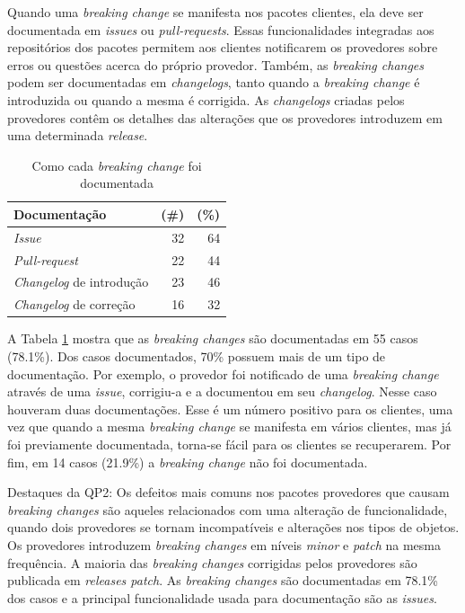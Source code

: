 Quando uma \textit{breaking change} se manifesta nos pacotes clientes, ela deve ser documentada em \textit{issues} ou \textit{pull-requests}. Essas funcionalidades integradas aos repositórios dos pacotes permitem aos clientes notificarem os provedores sobre erros ou questões acerca do próprio provedor. Também, as \textit{breaking changes} podem ser documentadas em \textit{changelogs}, tanto quando a \textit{breaking change} é introduzida ou quando a mesma é corrigida. As \textit{changelogs} criadas pelos provedores contêm os detalhes das alterações que os provedores introduzem em uma determinada \textit{release}.

\begin{table}
	\centering
	\caption{Como cada \textit{breaking change} foi documentada}
	\begin{tabular}{lrr}
		\toprule
		\textbf{Documentação} & \textbf{(\#)} & \textbf{(\%)}   \\ \hline
		\textit{Issue}        & 32            & 64              \\
		\textit{Pull-request} & 22            & 44              \\
		\textit{Changelog} de introdução & 23 & 46              \\
		\textit{Changelog} de correção   & 16 & 32              \\ %
		\bottomrule
	\end{tabular}
	\label{tab:bc_documentation}
\end{table}

A Tabela \ref{tab:bc_documentation} mostra que as \textit{breaking changes} são documentadas em 55 casos (78.1\%). Dos casos documentados, 70\% possuem mais de um tipo de documentação. Por exemplo, o provedor foi notificado de uma \textit{breaking change} através de uma \textit{issue}, corrigiu-a e a documentou em seu \textit{changelog}. Nesse caso houveram duas documentações. Esse é um número positivo para os clientes, uma vez que quando a mesma \textit{breaking change} se manifesta em vários clientes, mas já foi previamente documentada, torna-se fácil para os clientes se recuperarem. Por fim, em 14 casos (21.9\%) a \textit{breaking change} não foi documentada.

\begin{mdframed}
Destaques da QP2: Os defeitos mais comuns nos pacotes provedores que causam \textit{breaking changes} são aqueles relacionados com uma alteração de funcionalidade, quando dois provedores se tornam incompatíveis e alterações nos tipos de objetos. Os provedores introduzem \textit{breaking changes} em níveis \textit{minor} e \textit{patch} na mesma frequência. A maioria das \textit{breaking changes} corrigidas pelos provedores são publicada em \textit{releases patch}. As \textit{breaking changes} são documentadas em 78.1\% dos casos e a principal funcionalidade usada para documentação são as \textit{issues}.
\end{mdframed}

